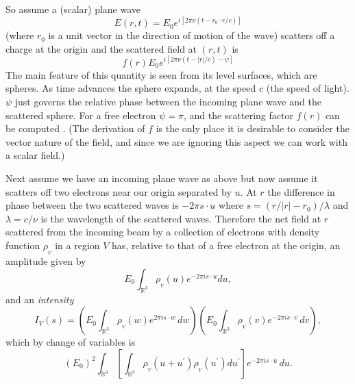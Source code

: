\documentclass[reqno]{stml-l}
\theoremstyle{plain}
\theoremstyle{definition}
\numberwithin{equation}{chapter}
\begin{document}
So assume a (scalar) plane wave
\begin{equation}
E(r, t)=E_{0}e^{i[2\pi\nu(t-r_{0}\cdot r/c)]}\label{ch02:eqn2.3}
\end{equation}
(where $r_{0}$ is a unit vector in the direction of motion of the wave) scatters off a charge at the origin and the scattered field at $(r, t)$ is
\begin{equation}
f(r)E_{0}e^{i[2\pi\nu(t-|r|/c)-\psi]}\label{ch02:eqn2.4}
\end{equation}
The main feature of this quantity is seen from its level surfaces, which are spheres. As time advances the sphere expands, at the speed $c$ (the speed of light). $\psi$ just governs the relative phase between the incoming plane wave and the scattered sphere. For a free electron $\psi=\pi$, and the scattering factor $f(r)$ can be computed \cite[p. 9]{bib:Gui}. (The derivation of $f$ is the only place it is desirable to consider the vector nature of the field, and since we are ignoring this aspect we can work with a scalar field.)

Next assume we have an incoming plane wave as above but now assume it scatters off two electrons near our origin separated by $u$. At $r$ the difference in phase between the two scattered waves is $-2\pi s\cdot u$ where $s=(r/|r|-r_{0})/\lambda$ and $\lambda=c/\nu$ is the wavelength of the scattered waves. Therefore the net field at $r$ scattered from the incoming beam by a collection of electrons with density function $\rho_{_{V}}$ in a region $V$ has, relative to that of a free electron at the origin, an amplitude given by
\begin{equation}
E_{0}\int_{\mathbb{R}^{3}}\rho_{_{V}}(u)e^{-2\pi is\cdot u}du,\label{ch02:eqn2.5}
\end{equation}
and an \emph{intensity}
\begin{equation}
I_{V}(s)=(E_{0}\int_{\mathbb{R}^{3}}\rho_{_{V}}(w)e^{2\pi is\cdot w}\,dw)(E_{0}\int_{\mathbb{R}^{3}}\rho_{_{V}}(v)e^{-2\pi is\cdot v}\,dv),\label{ch02:eqn2.6}
\end{equation}
which by change of variables is
\begin{equation}
(E_{0})^{2}\int_{\mathbb{R}^{3}}[\int_{\mathbb{R}^{3}}\rho_{_{V}}(u+u^{\prime})\rho_{_{V}}(u^{\prime})du^{\prime}]e^{-2\pi is\cdot u}\,du.\label{ch02:eqn2.7}
\end{equation}
\end{document}
